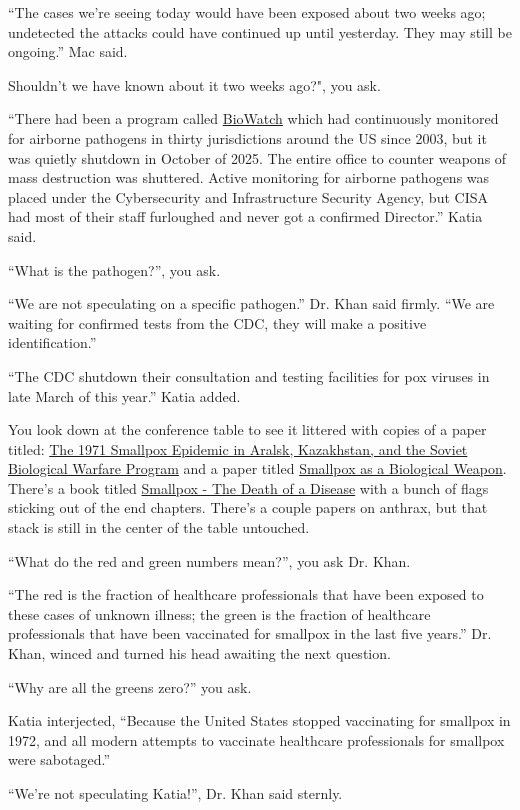 \documentclass[17pt, twoside, a5paper, openright, extrafontsizes]{memoir}
\renewcommand{\emph}[1]{\ul{#1}}
\begin{document}
``The cases we're seeing today would have been exposed about two weeks
ago; undetected the attacks could have continued up until yesterday.
They may still be ongoing.'' Mac said.

Shouldn't we have known about it two weeks ago?", you ask.

``There had been a program called \emph{BioWatch} which had continuously
monitored for airborne pathogens in thirty jurisdictions around the US
since 2003, but it was quietly shutdown in October of 2025. The entire
office to counter weapons of mass destruction was shuttered. Active
monitoring for airborne pathogens was placed under the Cybersecurity and
Infrastructure Security Agency, but CISA had most of their staff
furloughed and never got a confirmed Director.'' Katia said.

``What is the pathogen?'', you ask.

``We are not speculating on a specific pathogen.'' Dr. Khan said firmly.
``We are waiting for confirmed tests from the CDC, they will make a
positive identification.''

``The CDC shutdown their consultation and testing facilities for pox
viruses in late March of this year.'' Katia added.

You look down at the conference table to see it littered with copies of
a paper titled: \emph{The 1971 Smallpox Epidemic in Aralsk, Kazakhstan,
and the Soviet Biological Warfare Program} and a paper titled
\emph{Smallpox as a Biological Weapon}. There's a book titled
\emph{Smallpox - The Death of a Disease} with a bunch of flags sticking
out of the end chapters. There's a couple papers on anthrax, but that
stack is still in the center of the table untouched.

``What do the red and green numbers mean?'', you ask Dr. Khan.

``The red is the fraction of healthcare professionals that have been
exposed to these cases of unknown illness; the green is the fraction of
healthcare professionals that have been vaccinated for smallpox in the
last five years.'' Dr. Khan, winced and turned his head awaiting the
next question.

``Why are all the greens zero?'' you ask.

Katia interjected, ``Because the United States stopped vaccinating for
smallpox in 1972, and all modern attempts to vaccinate healthcare
professionals for smallpox were sabotaged.''

``We're not speculating Katia!'', Dr. Khan said sternly.
\end{document}

